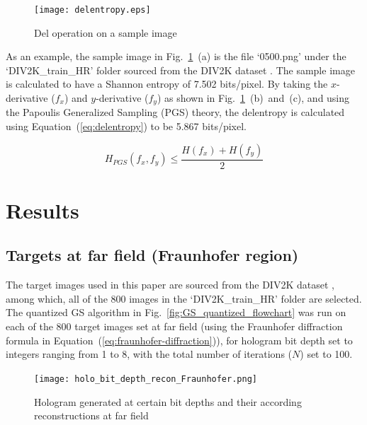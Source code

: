 	\begin{figure} [ht]
	   \begin{center}
	   \texttt{[image: delentropy.eps]}
	   \end{center}
	   \caption{\label{fig:delentropy} Del operation on a sample image}
	\end{figure}

	As an example, the sample image in Fig.~\ref{fig:delentropy}~(a) is the file `0500.png' under the `DIV2K\_train\_HR' folder sourced from the DIV2K dataset \cite{Agustsson2017}. The sample image is calculated to have a Shannon entropy of 7.502 bits/pixel. By taking the $x$-derivative ($f_x$) and $y$-derivative ($f_y$) as shown in Fig.~\ref{fig:delentropy}~(b)~and~(c), and using the Papoulis Generalized Sampling (PGS) \cite{Papoulis1977} theory, the delentropy is calculated using Equation~(\ref{eq:delentropy})\cite{Larkin2016} to be 5.867 bits/pixel.

	\begin{equation}
		H_{PGS}(f_x, f_y) \leq \frac{H(f_x) + H(f_y)}{2}
		\label{eq:delentropy}
	\end{equation}



\section{Results}
\subsection{Targets at far field (Fraunhofer region)} \label{sec:Fraunhofer_results}
	The target images used in this paper are sourced from the DIV2K dataset \cite{Agustsson2017}, among which, all of the 800 images in the `DIV2K\_train\_HR' folder are selected. The quantized GS algorithm in Fig.~\ref{fig:GS_quantized_flowchart} was run on each of the 800 target images set at far field (using the Fraunhofer diffraction formula in Equation~(\ref{eq:fraunhofer-diffraction})), for hologram bit depth set to integers ranging from 1 to 8, with the total number of iterations ($N$) set to 100.

	\begin{figure} [ht]
	   \begin{center}
	   \texttt{[image: holo\_bit\_depth\_recon\_Fraunhofer.png]}
	   \end{center}
	   \caption{\label{fig:holo_bit_depth_recon_Fraunhofer} Hologram generated at certain bit depths and their according reconstructions at far field}
	\end{figure}

